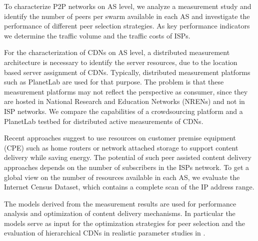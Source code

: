 To characterize P2P networks on AS level, we analyze a measurement study and identify the number of peers per swarm available in each AS and investigate the performance of different peer selection strategies.
As key performance indicators we determine the traffic volume and the traffic costs of ISPs.

For the characterization of CDNs on AS level, a distributed measurement architecture is necessary to identify the server resources, due to the location based server assignment of CDNs.
Typically, distributed measurement platforms such as PlanetLab are used for that purpose.
The problem is that these measurement platforms may not reflect the perspective as consumer, since they are hosted in National Research and Education Networks (NRENs) and not in ISP networks.
We compare the capabilities of a crowdsourcing platform and a PlanetLab testbed for distributed active measurements of CDNs.

Recent approaches \cite{valancius2009greening} suggest to use resources on customer premise equipment (CPE) such as home routers or network attached storage to support content delivery while saving energy.
The potential of such peer assisted content delivery approaches depends on the number of subscribers in the ISPs network.
To get a global view on the number of resources available in each AS, we evaluate the Internet Census Dataset, which contains a complete scan of the IP address range.


The models derived from the measurement results are used for performance analysis and optimization of content delivery mechanisms.
In particular the models serve as input for the optimization strategies for peer selection and the evaluation of hierarchical CDNs in realistic parameter studies in .

